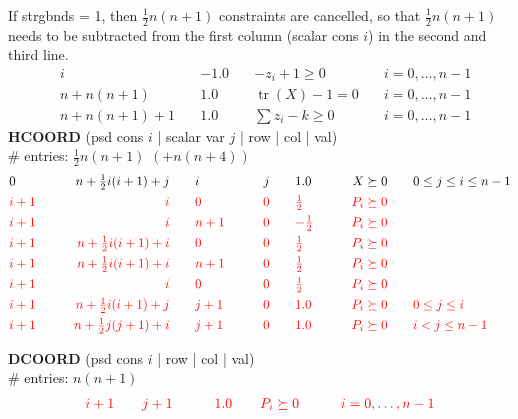 \documentclass[11pt,a4paper]{article}
\DeclareMathOperator{\tr}{tr}
\theoremstyle{definition}
\begin{document}
{{\color{blue} If strgbnds = 1, then $\tfrac{1}{2}n(n+1)$ constraints are cancelled, so
  that $\tfrac{1}{2}n(n+1)$ needs to be subtracted from the first column
  (scalar cons $i$) in the second and third line.}
\[
  \begin{aligned}
    & i \quad & -1.0 \quad & -z_i + 1 \geq 0 \quad & i = 0,\dots,n-1 \\
    & n+n(n+1) \quad & 1.0 \quad & \tr(X) - 1 = 0 \quad & i = 0,\dots,n-1
    \\
    & n+n(n+1)+1 \quad & 1.0 \quad & \sum z_i - k \geq 0 \quad & i =
    0,\dots,n-1
  \end{aligned}
\]
\textbf{HCOORD} (psd cons $i$ | scalar var $j$ | row | col | val) \\
\# entries: $\tfrac{1}{2}n(n+1)$ {\color{red} $(+n(n+4))$} \\
\[
  \begin{aligned}
    &0 \qquad &n+\tfrac{1}{2}i(i+1)+j \qquad &i \qquad &j \qquad &1.0
    \qquad &X \succeq 0 \qquad &0 \leq j \leq i \leq n-1 \\
    &{\color{red}i+1} \qquad &{\color{red}i} \qquad &{\color{red}0} \qquad
    &{\color{red}0} \qquad &{\color{red}\tfrac{1}{2}} \qquad
    &{\color{red}P_i \succeq 0} \qquad & \\
    &{\color{red}i+1} \qquad &{\color{red}i} \qquad &{\color{red}n+1} \qquad
    &{\color{red}0} \qquad &{\color{red}-\tfrac{1}{2}} \qquad
    &{\color{red}P_i \succeq 0} \qquad &\\
    &{\color{red}i+1} \qquad &{\color{red}n+\tfrac{1}{2}i(i+1)+i} \qquad &{\color{red}0} \qquad
    &{\color{red}0} \qquad &{\color{red}\tfrac{1}{2}} \qquad
    &{\color{red}P_i \succeq 0} \qquad &\\
    &{\color{red}i+1} \qquad &{\color{red}n+\tfrac{1}{2}i(i+1)+i} \qquad &{\color{red}n+1} \qquad
    &{\color{red}0} \qquad &{\color{red}\tfrac{1}{2}} \qquad
    &{\color{red}P_i \succeq 0} \qquad &\\
    &{\color{red}i+1} \qquad &{\color{red}i} \qquad &{\color{red}0} \qquad
    &{\color{red}0} \qquad &{\color{red}\tfrac{1}{2}} \qquad
    &{\color{red}P_i \succeq 0} \qquad &\\
    &{\color{red}i+1} \qquad &{\color{red}n+\tfrac{1}{2}i(i+1)+j} \qquad &{\color{red}j+1} \qquad
    &{\color{red}0} \qquad &{\color{red}1.0} \qquad
    &{\color{red}P_i \succeq 0} \qquad &{\color{red}0 \leq j \leq i}\\ 
    &{\color{red}i+1} \qquad &{\color{red}n+\tfrac{1}{2}j(j+1)+i} \qquad &{\color{red}j+1} \qquad
    &{\color{red}0} \qquad &{\color{red}1.0} \qquad
    &{\color{red}P_i \succeq 0} \qquad &{\color{red}i < j \leq
      n-1 }
  \end{aligned}
\]
{\color{red}\textbf{DCOORD} (psd cons $i$ | row | col | val) \\
  \# entries: $n(n+1)$\\
  \[
    \begin{aligned}
      {\color{red} i+1} \qquad & {\color{red} j+1} \qquad & {\color{red}
        1.0} \qquad & {\color{red} P_i \succeq 0} \qquad & {\color{red} i =
        0, \dots, n-1}
    \end{aligned}
    \]

  }
}
\end{document}

